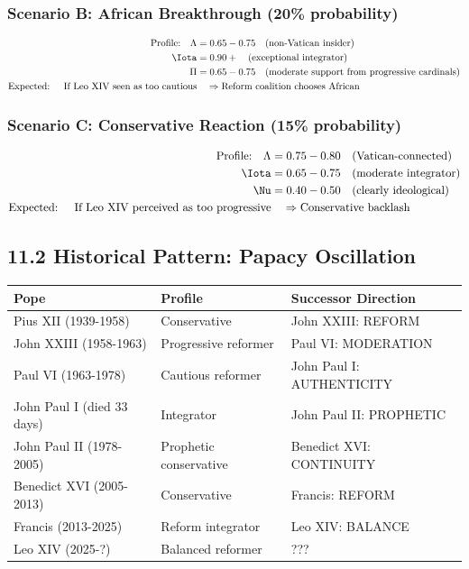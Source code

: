\subsubsection{Scenario B: African Breakthrough (20\% probability)}
\begin{align*}
\text{Profile:} \quad \Lambda &= 0.65-0.75 \quad \text{(non-Vatican insider)} \\
\Iota &= 0.90+ \quad \text{(exceptional integrator)} \\
\Pi &= 0.65-0.75 \quad \text{(moderate support from progressive cardinals)} \\
\text{Expected: } \quad \text{If Leo XIV seen as too cautious} &\quad \Rightarrow \text{Reform coalition chooses African}
\end{align*}

\subsubsection{Scenario C: Conservative Reaction (15\% probability)}
\begin{align*}
\text{Profile:} \quad \Lambda &= 0.75-0.80 \quad \text{(Vatican-connected)} \\
\Iota &= 0.65-0.75 \quad \text{(moderate integrator)} \\
\Nu &= 0.40-0.50 \quad \text{(clearly ideological)} \\
\text{Expected: } \quad \text{If Leo XIV perceived as too progressive} &\quad \Rightarrow \text{Conservative backlash}
\end{align*}

\subsection{11.2 Historical Pattern: Papacy Oscillation}

\begin{table}[h]
\centering
\begin{tabular}{|l|l|l|}
\hline
\textbf{Pope} & \textbf{Profile} & \textbf{Successor Direction} \\
\hline
Pius XII (1939-1958) & Conservative & John XXIII: REFORM \\
John XXIII (1958-1963) & Progressive reformer & Paul VI: MODERATION \\
Paul VI (1963-1978) & Cautious reformer & John Paul I: AUTHENTICITY \\
John Paul I (died 33 days) & Integrator & John Paul II: PROPHETIC \\
John Paul II (1978-2005) & Prophetic conservative & Benedict XVI: CONTINUITY \\
Benedict XVI (2005-2013) & Conservative & Francis: REFORM \\
Francis (2013-2025) & Reform integrator & Leo XIV: BALANCE \\
Leo XIV (2025-?) & Balanced reformer & ??? \\
\hline
\end{tabular}
\end{table}

